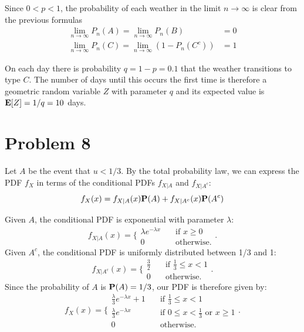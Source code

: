 \documentclass{homework}
\begin{document}
\begin{letterenum}
\item Since $0<p<1$, the probability of each weather in the limit $n\to\infty$ is
clear from the previous formulas
\begin{align*}
    \lim_{n\to\infty} P_n(A) = \lim_{n\to\infty} P_n(B) &= 0 \\
    \lim_{n\to\infty} P_n(C) = \lim_{n\to\infty} (1 - P_n(C^c)) &= 1
\end{align*}

\item On each day there is probability $q=1 - p = 0.1$ that the weather transitions to
type $C$. The number of days until this occurs the first time is therefore a geometric
random variable $Z$ with parameter $q$ and its expected value is ${\bf E}[Z] = 1/q=10$ days.

\end{letterenum}

\section{Problem 8}

Let $A$ be the event that $u < 1/3$. By the total probability law, we can express
the PDF $f_X$ in terms of the conditional PDFs $f_{X|A}$ and $f_{X|A^c}$:
\begin{equation*}
    f_X(x) = f_{X | A}(x) {\bf P}(A) + f_{X | A^c}(x) {\bf P}(A^c)
\end{equation*}

Given $A$, the conditional PDF is exponential with parameter $\lambda$:
\begin{equation*}
    f_{X | A}(x) = \biggl\{
        \begin{array}{ll}
            \lambda e^{-\lambda x} &\quad \text{if }x \geq 0 \\
            0 &\quad \text{otherwise.}
        \end{array}
    \biggr.
\end{equation*}
Given $A^c$, the conditional PDF is uniformly distributed between 1/3 and 1:
\begin{equation*}
    f_{X|A^c}(x) = \biggl\{
        \begin{array}{ll}
            \frac{3}{2} &\quad \text{if } \frac{1}{3} \leq x < 1 \\
            0 &\quad \text{otherwise.}
        \end{array}
    \biggr.
\end{equation*}
Since the probability of $A$ is ${\bf P}(A) = 1/3$, our PDF is therefore given
by:
\begin{equation*}
    f_X(x) = \biggl\{
        \begin{array}{ll}
            \frac{\lambda}{3} e^{-\lambda x} + 1 &\quad \text{if }\frac{1}{3} \leq x < 1 \\
            \frac{\lambda}{3} e^{-\lambda x} &\quad \text{if }0 \leq x < \frac{1}{3} \text{ or } x \geq 1 \\
            0 &\quad \text{otherwise.}
        \end{array}
    \biggr.
\end{equation*}
\end{document}
